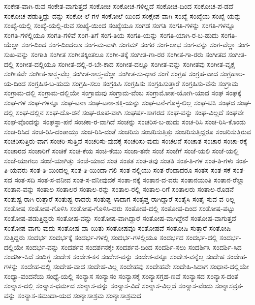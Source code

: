 {ಸಂಕೇತ-ವಾಗಿ-ರುವ
ಸಂಕೇತ-ವಾಗುತ್ತದೆ
ಸಂಕೋಚ
ಸಂಕೋಚ-ಗಳಿಲ್ಲದೆ
ಸಂಕೋಚ-ದಿಂದ
ಸಂಕೋಚ-ಪ-ಡದೆ
ಸಂಕೋಚ-ಪಡುತ್ತಿದ್ದು-ದನ್ನು
ಸಂಕೋ-ಲೆ-ಗಳ
ಸಂಕೋಲೆ-ಯಿಂದ
ಸಂಕ್ಷೇಪ-ವಾಗಿ
ಸಂಖ್ಯೆ
ಸಂಖ್ಯೆಯ
ಸಂಖ್ಯೆ-ಯನ್ನು
ಸಂಖ್ಯೆ-ಯಲ್ಲಿ
ಸಂಖ್ಯೆ-ಯಲ್ಲಿ-ರುವ
ಸಂಖ್ಯೆ-ಯಿಂದ
ಸಂಖ್ಯೆಯೂ
ಸಂಗಡ
ಸಂಗತಿ
ಸಂಗತಿ-ಗಳನ್ನು
ಸಂಗತಿ-ಗಳನ್ನೂ
ಸಂಗತಿ-ಗಳಲ್ಲಿಯೂ
ಸಂಗತಿ-ಗಳಿವೆ
ಸಂಗ-ತಿಗೆ
ಸಂಗ-ತಿಯ
ಸಂಗತಿ-ಯನ್ನು
ಸಂಗತಿ-ಯಾಗಿ-ರ-ಬ-ಹುದು
ಸಂಗತಿ-ಯೆಲ್ಲಾ
ಸಂಗ-ದಿಂದ
ಸಂಗ-ದಿಂದಲೂ
ಸಂಗ-ಮ-ವಾಗಿ
ಸಂಗಮ್
ಸಂಗರ
ಸಂಗ-ಲಾಭ
ಸಂಗ-ವನ್ನು
ಸಂಗ-ವೆಲ್ಲಾ
ಸಂಗ-ಸುಖ-ವನ್ನು
ಸಂಗಾತಿ
ಸಂಗೀತ
ಸಂಗೀತಕ್ಕಿಂತಲೂ
ಸಂಗೀ-ತಕ್ಕೆ
ಸಂಗೀತ-ಗಾ-ರರ
ಸಂಗೀತ-ಗಾ-ರರು
ಸಂಗೀತದ
ಸಂಗೀತ-ದಲ್ಲಿ
ಸಂಗೀತ-ದಲ್ಲಿಯೂ
ಸಂಗೀತ-ದಲ್ಲಿ-ರ-ಬೇ-ಕಾದ
ಸಂಗೀತ-ದಲ್ಲೂ
ಸಂಗೀತ-ವನ್ನು
ಸಂಗೀತವು
ಸಂಗೀತ-ವೃಕ್ಷ
ಸಂಗೀತವೇ
ಸಂಗೀತ-ಶಾಸ್ತ್ರ-ವೆಲ್ಲ
ಸಂಗೀತ-ಶಾಸ್ತ್ರ-ವೆಲ್ಲಾ
ಸಂಗೀತ-ಸು-ಧಾರ
ಸಂಗೆ
ಸಂಗ್ರಹ
ಸಂಗ್ರಹ-ವಾದ
ಸಂಗ್ರಹಾಲ-ಯ-ದಿಂದ
ಸಂಗ್ರಹಿಸ-ಬ-ಹುದು
ಸಂಗ್ರಹಿ-ಸಲು
ಸಂಗ್ರಹಿಸಿ
ಸಂಗ್ರಹಿಸು
ಸಂಗ್ರಹಿಸುತ್ತಾರೆ
ಸಂಗ್ರಹಿಸು-ವೆನು
ಸಂಗ್ರಾಮ
ಸಂಗ್ರಾಮ-ದಲ್ಲಿ
ಸಂಗ್ರಾಮ-ದಲ್ಲಿಯೇ
ಸಂಗ್ರಾಮವು
ಸಂಗ್ರಾಮ-ವೆಂಬ
ಸಂಗ್ರಾಮೋಪ-ಯೋಗಿ-ಯಾದ
ಸಂಘ
ಸಂಘಕ್ಕೆ
ಸಂಘ-ಗಳ
ಸಂಘ-ಗಳನ್ನೂ
ಸಂಘ-ಟನಾ
ಸಂಘ-ಟನಾ-ಶಕ್ತಿ-ಯನ್ನು
ಸಂಘ-ಟನೆ-ಗೊಳ್ಳ-ಲಿಲ್ಲ
ಸಂಘ-ಟಿಸಿ
ಸಂಘದ
ಸಂಘ-ದಲ್ಲಿ
ಸಂಘ-ದಲ್ಲಿನ
ಸಂಘ-ದೊ-ಡನೆ
ಸಂಘ-ರೂಪ-ವಾಗಿ
ಸಂಘರ್ಷ-ಸಾಗರದ
ಸಂಘ-ವನ್ನು
ಸಂಘ-ವಿಲ್ಲದೆ
ಸಂಘವೇ
ಸಂಘ-ವೊಂದನ್ನು
ಸಂಘಸ್ಥಾ-ಪನೆ
ಸಂಚಕಾ-ರ-ವಾಗಿದೆ
ಸಂಚನ್ನು
ಸಂಚರಿಸ-ಬ-ಹುದು
ಸಂಚ-ರಿಸಿ
ಸಂಚ-ರಿಸಿ-ಕೊಂಡು
ಸಂಚ-ರಿಸಿದ
ಸಂಚ-ರಿಸಿ-ದಂತಾಯ್ತು
ಸಂಚ-ರಿಸಿ-ದಂತೆ
ಸಂಚರಿಸು
ಸಂಚರಿಸುತ್ತಿತ್ತು
ಸಂಚರಿಸುತ್ತಿದ್ದರೂ
ಸಂಚರಿಸುತ್ತಿರುವ
ಸಂಚರಿಸುತ್ತಿರು-ವಾಗ
ಸಂಚರಿ-ಸುತ್ತಿವೆ
ಸಂಚರಿಸು-ವುದಕ್ಕೆ
ಸಂಚರಿಸು-ವುದು
ಸಂಚಲನೆ
ಸಂಚಾತ
ಸಂಚಾರ
ಸಂಚಾ-ರಕ್ಕೆ
ಸಂಚಾರದ
ಸಂಚಾರಿಗೆ
ಸಂಚಿಕೆ
ಸಂಚಿ-ಕೆಯ
ಸಂಚಿ-ಕೆಯು
ಸಂಜಾ-ತನೇ
ಸಂಜೆ
ಸಂಜೆಗೆ
ಸಂಜೆ-ಯಲಿ
ಸಂಜೆ-ಯಲ್ಲಿ
ಸಂಜೆ-ಯಾಗಲು
ಸಂಜೆ-ಯಾಗಿತ್ತು
ಸಂಜೆ-ಯಾದ
ಸಂತ
ಸಂತತ
ಸಂತ-ತವು
ಸಂತತಿ
ಸಂತ-ತಿ-ಗಳ
ಸಂತ-ತಿ-ಗಳು
ಸಂತ-ತಿ-ಯವರು
ಸಂತ-ತಿ-ಯಿಂದಲ್ಲ
ಸಂತ-ತಿ-ಯಿಂದಾ-ಗಲಿ
ಸಂತ-ನಲ್ಲಿಯು
ಸಂತ-ರೆಂದಾದರೂ
ಸಂತಸ
ಸಂತ-ಸಕೆ
ಸಂತ-ಸದ
ಸಂತ-ಸದಿ
ಸಂತ-ಸ-ವನೀವ
ಸಂತ-ಸ-ವನೀವುದಕೆ
ಸಂತಾ-ನಕ್ಕೆ
ಸಂತಾನ-ದ-ವರು
ಸಂತಾನಯಂತಿ
ಸಂತಾನ-ರೆಲ್ಲಾ
ಸಂತಾನ-ವನ್ನು
ಸಂತಾಲ
ಸಂತಾಲರ
ಸಂತಾಲ-ರನ್ನು
ಸಂತಾಲ-ರಲ್ಲಿ
ಸಂತಾಲ-ರಿಗೆ
ಸಂತಾಲರು
ಸಂತಾಲ-ರೊಡನೆ
ಸಂತುಷ್ಟ-ರಾಗಿ-ರುತ್ತಾರೆ
ಸಂತುಷ್ಟ-ರಾದರು
ಸಂತುಷ್ಟ-ಳಾದಾಗ
ಸಂತೃಪ್ತ-ರಾಗಿದ್ದಾರೆ
ಸಂತೈಸಿ
ಸಂತೈ-ಸುವ-ವ-ರಿಲ್ಲ
ಸಂತೋಷ
ಸಂತೋಷ-ಗೊಳಿಸಿ
ಸಂತೋಷ-ಗೊಳಿಸಿ-ದರು
ಸಂತೋಷ-ದಲ್ಲಿ
ಸಂತೋಷ-ದಿಂದ
ಸಂತೋಷ-ಪಟ್ಟು
ಸಂತೋಷ-ಪಡುತ್ತಿದ್ದರು
ಸಂತೋಷ-ವನ್ನು
ಸಂತೋಷ-ವಾಗಿದ್ದಾರೆ
ಸಂತೋಷ-ವಾಗಿದ್ದೇನೆ
ಸಂತೋಷ-ವಾಗುತ್ತದೆ
ಸಂತೋಷ-ವಾಗು-ವುದು
ಸಂತೋಷ-ವಾ-ಯಿತು
ಸಂತೋಷವೂ
ಸಂತೋಷವೆ
ಸಂತೋಷಿ-ಸುತ್ತಾರೆ
ಸಂತೋಷಿ-ಸುತ್ತಿದ್ದರು
ಸಂದರ್ಭ
ಸಂದರ್ಭಕ್ಕೆ
ಸಂದರ್ಭ-ಗಳಲ್ಲಿ
ಸಂದರ್ಭ-ಗಳಲ್ಲಿಯೂ
ಸಂದರ್ಭದ
ಸಂದರ್ಭ-ದಲ್ಲಿ
ಸಂದರ್ಭ-ದಲ್ಲಿಯೇ
ಸಂದರ್ಭ-ವನ್ನು
ಸಂದರ್ಶನ
ಸಂದರ್ಶನಕ್ಕೇ
ಸಂದರ್ಶನ-ದಿಂದ
ಸಂದರ್ಶಿ-ಸಲು
ಸಂದರ್ಶಿಸಿ
ಸಂದರ್ಶಿ-ಸಿದ
ಸಂದರ್ಶಿ-ಸಿದೆ
ಸಂದಿಗ್ಧ
ಸಂದೇಶ
ಸಂದೇಶ-ಕನ
ಸಂದೇಶ-ವನ್ನು
ಸಂದೇಶ-ವನ್ನೂ
ಸಂದೇಶ-ವನ್ನೆಲ್ಲ
ಸಂದೇಹ
ಸಂದೇಹ-ಗಳನ್ನು
ಸಂದೇಹ-ದಲ್ಲಿ
ಸಂದೇಹ-ವಾದ
ಸಂದೇಹ-ವಿಲ್ಲ
ಸಂದೇಹವು
ಸಂದೇಹವೇ
ಸಂದೇಹಿ-ಸಿದಾಗ
ಸಂಧಾನ-ದಲ್ಲಿಯೇ
ಸಂಧ್ಯಾ-ವಂದನೆಯ
ಸಂಧ್ಯೆ-ಯಲ್ಲಿ
ಸಂನ್ಯಾಸ
ಸಂನ್ಯಾಸಂ
ಸಂನ್ಯಾಸಕ್ಕೆ
ಸಂನ್ಯಾಸಗ್ರಹ-ಣವೆ
ಸಂನ್ಯಾಸದ
ಸಂನ್ಯಾಸ-ದಂತೆ
ಸಂನ್ಯಾಸ-ದಲ್ಲಿ
ಸಂನ್ಯಾಸ-ಧರ್ಮದ
ಸಂನ್ಯಾಸ-ವನ್ನು
ಸಂನ್ಯಾಸ-ವಿದೆ
ಸಂನ್ಯಾಸ-ವಿಲ್ಲದೆ
ಸಂನ್ಯಾಸ-ವೆಂದು
ಸಂನ್ಯಾಸವ್ರತ-ವನ್ನು
ಸಂನ್ಯಾಸ-ಸಮುದಾ-ಯದ
ಸಂನ್ಯಾಸಾಶ್ರಮ
ಸಂನ್ಯಾಸಾಶ್ರಮದ
}

